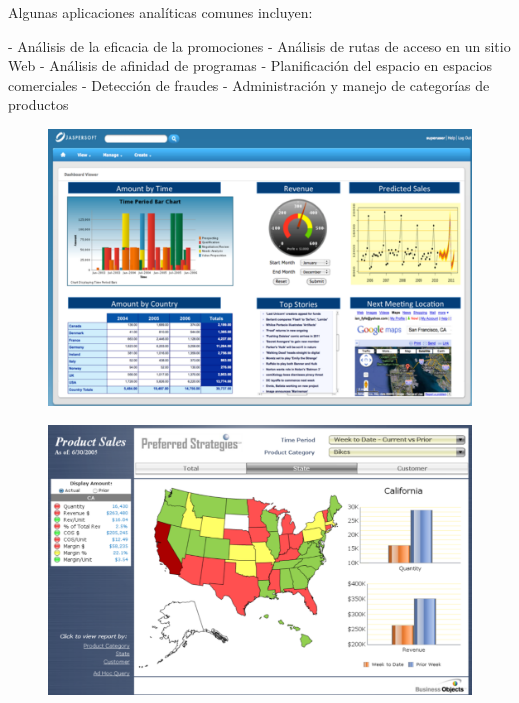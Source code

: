 \documentclass[preprint,12pt]{elsarticle}
\begin{document}
\begin{itemize}
Algunas aplicaciones analíticas comunes incluyen:

- Análisis de la eficacia de la promociones
- Análisis de rutas de acceso en un sitio Web
- Análisis de afinidad de programas
- Planificación del espacio en espacios comerciales
- Detección de fraudes
- Administración y manejo de categorías de productos


			\begin{figure}[htb]
				\begin{center}
					\includegraphics[width=15cm]{./IMAGENES/kimball3}
				\end{center}
			\end{figure}
			
			\begin{figure}[htb]
				\begin{center}
					\includegraphics[width=15cm]{./IMAGENES/kimball4}
				\end{center}
			\end{figure}


\end{itemize}
\end{document}
